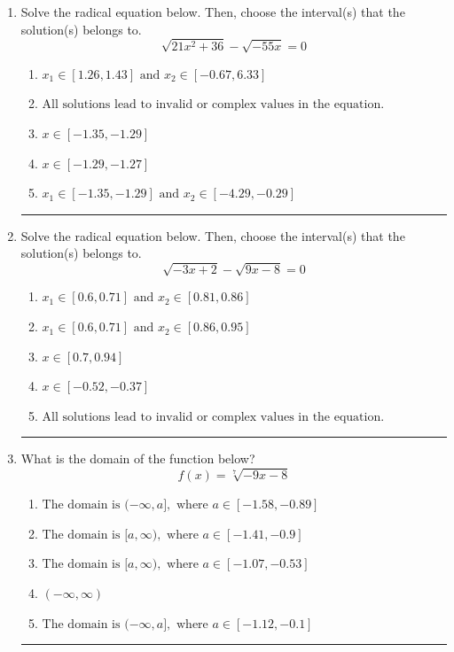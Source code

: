 \documentclass[14pt]{extbook}
\newcommand{\litem}[1]{\item#1\hspace*{-1cm}\rule{\textwidth}{0.4pt}}
\begin{document}
\begin{enumerate}
{\begin{enumerate}[label=\Alph*.]
\end{enumerate} }
\litem{
Solve the radical equation below. Then, choose the interval(s) that the solution(s) belongs to.\[ \sqrt{21 x^2 + 36} - \sqrt{-55 x} = 0 \]\begin{enumerate}[label=\Alph*.]
\item \( x_1 \in [1.26, 1.43] \text{ and } x_2 \in [-0.67,6.33] \)
\item \( \text{All solutions lead to invalid or complex values in the equation.} \)
\item \( x \in [-1.35,-1.29] \)
\item \( x \in [-1.29,-1.27] \)
\item \( x_1 \in [-1.35, -1.29] \text{ and } x_2 \in [-4.29,-0.29] \)

\end{enumerate} }
\litem{
Solve the radical equation below. Then, choose the interval(s) that the solution(s) belongs to.\[ \sqrt{-3 x + 2} - \sqrt{9 x - 8} = 0 \]\begin{enumerate}[label=\Alph*.]
\item \( x_1 \in [0.6, 0.71] \text{ and } x_2 \in [0.81,0.86] \)
\item \( x_1 \in [0.6, 0.71] \text{ and } x_2 \in [0.86,0.95] \)
\item \( x \in [0.7,0.94] \)
\item \( x \in [-0.52,-0.37] \)
\item \( \text{All solutions lead to invalid or complex values in the equation.} \)

\end{enumerate} }
\litem{
What is the domain of the function below?\[ f(x) = \sqrt[7]{-9 x - 8} \]\begin{enumerate}[label=\Alph*.]
\item \( \text{The domain is } (-\infty, a], \text{   where } a \in [-1.58, -0.89] \)
\item \( \text{The domain is } [a, \infty), \text{   where } a \in [-1.41, -0.9] \)
\item \( \text{The domain is } [a, \infty), \text{   where } a \in [-1.07, -0.53] \)
\item \( (-\infty, \infty) \)
\item \( \text{The domain is } (-\infty, a], \text{   where } a \in [-1.12, -0.1] \)


\end{enumerate}}
\end{enumerate}
\end{document}
